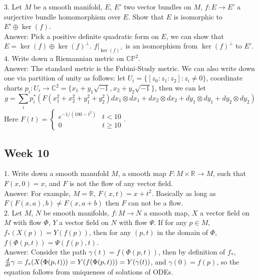 \documentclass{article}
\theoremstyle{definition}
\begin{document}
3. Let $M$ be a smooth manifold, $E$, $E'$ two vector bundles on $M$, $f: E\rightarrow E'$ a surjective bundle homomorphism over $E$. Show that $E$ is isomorphic to $E'\oplus \ker(f)$.\\

Answer: Pick a positive definite quadratic form on $E$, we can show that $E=\ker(f)\oplus \ker(f)^\perp$. $f|_{\ker(f)^\perp}$ is an isomorphism from $\ker(f)^\perp$ to $E'$.\\

4. Write down a Riemannian metric on $\mathbb{CP}^2$.\\

Answer: The standard metric is the Fubini-Study metric. We can also write down one via partition of unity as follows: let $U_i=\{[z_0:z_1:z_2]: z_i\not=0\}$, coordinate charts $p_i: U_i\rightarrow \mathbb{C}^2=\{x_1+y_1\sqrt{-1}, x_2+y_2\sqrt{-1}\}$, then we can let
\[g=\sum_ip^*_i(F(x_1^2+x_2^2+y_1^2+y_2^2)dx_1\otimes dx_1+dx_2\otimes dx_2+dy_1\otimes dy_1+dy_2\otimes dy_2)\]
Here $F(t)=\begin{cases}e^{-1/(100-t^2)} & t<10\\ 0& t\geq 10\end{cases}$.

\newpage

\subsection{Week 10}

1. Write down a smooth manufold $M$, a smooth map $F: M\times\mathbb{R}\rightarrow M$, such that $F(x, 0)=x$, and $F$ is not the flow of any vector field.\\

Answer: For example, $M=\mathbb{R}$, $F(x, t)=x+t^2$. Basically as long as $F(F(x, a), b)\not=F(x, a+b)$ then $F$ can not be a flow.\\

2. Let $M$, $N$ be smooth manifolds, $f: M\rightarrow N$ a smooth map, $X$ a vector field on $M$ with flow $\Phi$, $Y$ a vector field on $N$ with flow $\Psi$. If for any $p\in M$, $f_*(X(p))=Y(f(p))$, then for any $(p, t)$ in the domain of $\Phi$, $f(\Phi(p, t))=\Psi(f(p), t)$.\\

Answer: Consider the path $\gamma(t)=f(\Phi(p, t))$, then by definition of $f_*$, ${d\over dt}\gamma=f_*(X(\Phi(p, t)))=Y(f(\Phi(p, t)))=Y(\gamma(t))$, and $\gamma(0)=f(p)$, so the equation follows from uniqueness of solutions of ODEs.\\
\end{document}
